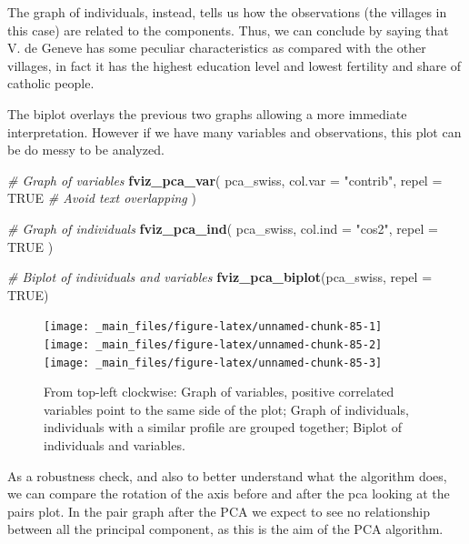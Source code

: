 \documentclass[
]{article}
\newenvironment{Shaded}{\begin{snugshade}}{\end{snugshade}}
\newcommand{\AttributeTok}[1]{\textcolor[rgb]{0.13,0.29,0.53}{#1}}
\newcommand{\CommentTok}[1]{\textcolor[rgb]{0.56,0.35,0.01}{\textit{#1}}}
\newcommand{\ConstantTok}[1]{\textcolor[rgb]{0.56,0.35,0.01}{#1}}
\newcommand{\FunctionTok}[1]{\textcolor[rgb]{0.13,0.29,0.53}{\textbf{#1}}}
\newcommand{\NormalTok}[1]{#1}
\newcommand{\StringTok}[1]{\textcolor[rgb]{0.31,0.60,0.02}{#1}}
\begin{document}
The graph of individuals, instead, tells us how the observations (the
villages in this case) are related to the components. Thus, we can
conclude by saying that V. de Geneve has some peculiar characteristics
as compared with the other villages, in fact it has the highest
education level and lowest fertility and share of catholic people.

The biplot overlays the previous two graphs allowing a more immediate
interpretation. However if we have many variables and observations, this
plot can be do messy to be analyzed.

\begin{Shaded}
\begin{Highlighting}[]
\CommentTok{\# Graph of variables}
\FunctionTok{fviz\_pca\_var}\NormalTok{(}
\NormalTok{        pca\_swiss,}
        \AttributeTok{col.var =} \StringTok{"contrib"}\NormalTok{,}
        \AttributeTok{repel =} \ConstantTok{TRUE}     \CommentTok{\# Avoid text overlapping}
\NormalTok{)}

\CommentTok{\# Graph of individuals}
\FunctionTok{fviz\_pca\_ind}\NormalTok{(}
\NormalTok{        pca\_swiss,}
        \AttributeTok{col.ind =} \StringTok{"cos2"}\NormalTok{,}
        \AttributeTok{repel =} \ConstantTok{TRUE}
\NormalTok{)}

\CommentTok{\# Biplot of individuals and variables}
\FunctionTok{fviz\_pca\_biplot}\NormalTok{(pca\_swiss, }\AttributeTok{repel =} \ConstantTok{TRUE}\NormalTok{)}
\end{Highlighting}
\end{Shaded}

\begin{figure}[H]
\texttt{[image: \_main\_files/figure-latex/unnamed-chunk-85-1]} \texttt{[image: \_main\_files/figure-latex/unnamed-chunk-85-2]} \texttt{[image: \_main\_files/figure-latex/unnamed-chunk-85-3]} \caption{From top-left clockwise: Graph of variables, positive correlated variables point to the same side of the plot; Graph of individuals, individuals with a similar profile are grouped together; Biplot of individuals and variables.}\label{fig:unnamed-chunk-85}
\end{figure}

As a robustness check, and also to better understand what the algorithm
does, we can compare the rotation of the axis before and after the pca
looking at the pairs plot. In the pair graph after the PCA we expect to
see no relationship between all the principal component, as this is the
aim of the PCA algorithm.
\end{document}

